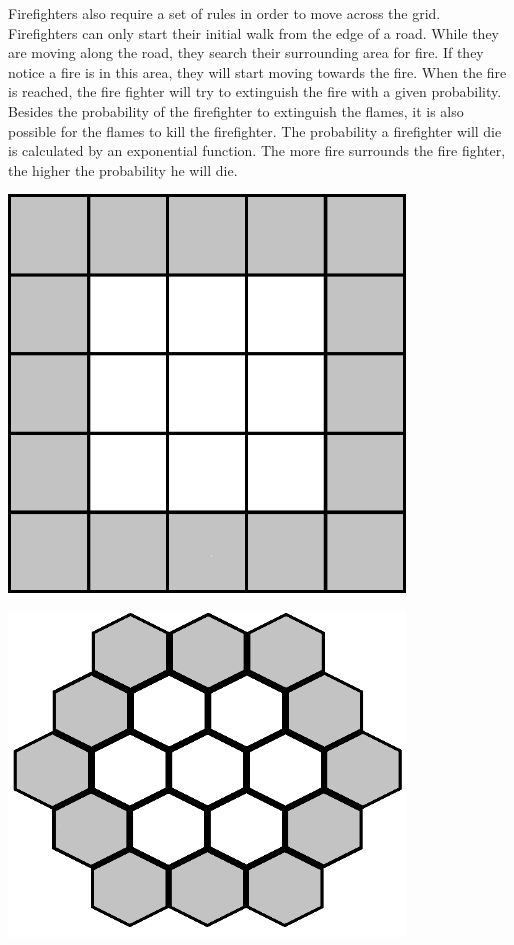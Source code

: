 \documentclass{article}
\newenvironment{Figure}
  {\par\medskip\noindent\minipage{\linewidth}}
  {\endminipage\par\medskip}
\begin{document}
\begin{multicols}{2}
Firefighters also require a set of rules in order to move across the grid. Firefighters can only start their initial walk from the edge of a road. While they are moving along the road, they search their surrounding area for fire. If they notice a fire is in this area, they will start moving towards the fire. When the fire is reached, the fire fighter will try to extinguish the fire with a given probability. Besides the probability of the firefighter to extinguish the flames, it is also possible for the flames to kill the firefighter. The probability a firefighter will die is calculated by an exponential function. The more fire surrounds the fire fighter, the higher the probability he will die.
\begin{Figure}
 \centering
 \includegraphics[width=0.79\textwidth]{imgs/extendedcartesian.png}
\label{fig:extcartesianstd}
\end{Figure}
\begin{Figure}
 \centering
 \includegraphics[width=0.79\textwidth]{imgs/extendedhexagonal.png}

\end{Figure}
\end{multicols}
\end{document}
